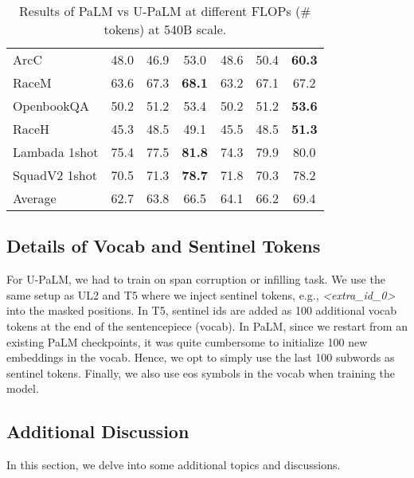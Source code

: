 \documentclass{article}
\newcommand{\modelname}{U-PaLM\xspace}
\begin{document}
\begin{table}[H]
\begin{tabular}{l|ccc|ccc}
         ArcC &48.0 & 46.9 & 53.0 & 48.6 & 50.4 & \textbf{60.3}\\
         RaceM & 63.6 & 67.3 & \textbf{68.1} & 63.2 & 67.1 & 67.2\\
         OpenbookQA & 50.2 & 51.2 & 53.4 & 50.2 & 51.2 & \textbf{53.6}\\
         RaceH & 45.3 & 48.5 & 49.1 & 45.5 & 48.5 & \textbf{51.3}\\
         Lambada 1shot & 75.4 & 77.5 & \textbf{81.8} & 74.3 & 79.9 &80.0 \\
         SquadV2 1shot & 70.5 & 71.3 & \textbf{78.7} & 71.8 & 70.3 & 78.2\\
         \midrule 
         Average & 62.7 & 63.8 & 66.5 & 64.1 &  66.2 & 69.4 \\
         \bottomrule
    \end{tabular}
    \caption{Results of PaLM vs \modelname at different FLOPs (\# tokens) at 540B scale.}
    \label{tab:my_label}
\end{table}

\subsection{Details of Vocab and Sentinel Tokens}
For \modelname, we had to train on span corruption or infilling task. We use the same setup as UL2 and T5 where we inject sentinel tokens, e.g., \textit{<extra\_id\_0>} into the masked positions. In T5, sentinel ids are added as 100 additional vocab tokens at the end of the sentencepiece (vocab). In PaLM, since we restart from an existing PaLM checkpoints, it was quite cumbersome to initialize 100 new embeddings in the vocab. Hence, we opt to simply use the last 100 subwords as sentinel tokens. Finally, we also use eos symbols in the vocab when training the model.

\subsection{Additional Discussion}
In this section, we delve into some additional topics and discussions.
\end{document}

